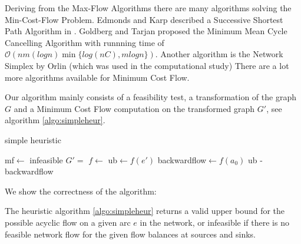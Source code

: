 Deriving from the Max-Flow Algorithms there are many algorithms solving the Min-Cost-Flow Problem. Edmonds and 
Karp described a Successive Shortest Path Algorithm in \cite{EdmondsKarp1972}. Goldberg and Tarjan proposed the Minimum 
Mean Cycle Cancelling Algorithm \cite{minMeanCycleCancelling89} with runnning time of $\mathcal{O}(nm(log 
n)\min\{log(nC), m log n\}) $. %
Another algorithm is the Network Simplex by Orlin \cite{NetworkSimplexOrlin97} (which was used in the computational 
study) There are a lot more algorithms available for Minimum Cost Flow.

Our algorithm mainly consists of a feasibility test, a transformation of the graph $G$ and a Minimum Cost Flow 
computation on the transformed graph $G'$, see algorithm \ref{algo:simpleheur}. 

\begin{algorithm}
 \caption{simple heuristic}
 \label{algo:simpleheur}
 \begin{algorithmic}
  \State mf$\gets$ 
    \State\Return infeasible
  \EndIf
  \State $G'=$ 
  \State $f\gets$ 
  \State ub$\gets f(e')$
  \State backwardflow$\gets f(a_0)$
  \State \Return ub - backwardflow
  \EndFunction
 \end{algorithmic}
\end{algorithm}

We show the correctness of the algorithm: %

\begin{prop}
 The heuristic algorithm \ref{algo:simpleheur} returns a valid upper bound for the possible acyclic flow on a given 
 arc $e$ in the network, or infeasible if there is no feasible network flow for the given flow balances at sources and 
 sinks.
\end{prop}

